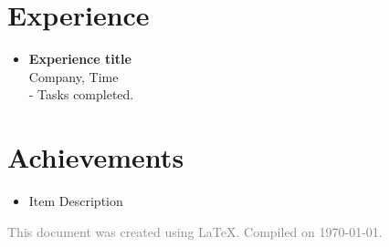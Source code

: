 \documentclass[11pt]{article}
\begin{document}
\section*{Experience}
\vspace{-0.1in}
\begin{itemize}[leftmargin=*]
    \item \textbf{Experience title} \\
    Company, Time \\
    - Tasks completed.
\end{itemize}

\section*{Achievements}
\vspace{-0.1in}
\begin{itemize}[leftmargin=*]
    \item Item Description
\end{itemize}

\vspace{0.2in}
\begin{center}
\footnotesize
\textcolor{gray}{This document was created using \LaTeX. Compiled on \today.}
\end{center}
\end{document}

